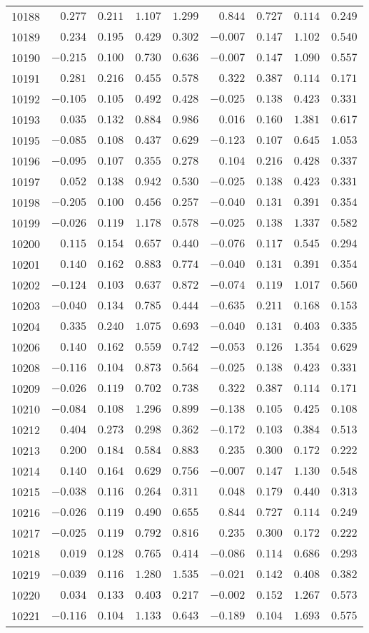 {\begin{longtable}{l|rrrr|rrrr}
10188&$ 0.277$&$0.211$&$1.107$&$1.299$&$ 0.844$&$0.727$&$0.114$&$0.249$\tabularnewline
10189&$ 0.234$&$0.195$&$0.429$&$0.302$&$-0.007$&$0.147$&$1.102$&$0.540$\tabularnewline
10190&$-0.215$&$0.100$&$0.730$&$0.636$&$-0.007$&$0.147$&$1.090$&$0.557$\tabularnewline
10191&$ 0.281$&$0.216$&$0.455$&$0.578$&$ 0.322$&$0.387$&$0.114$&$0.171$\tabularnewline
10192&$-0.105$&$0.105$&$0.492$&$0.428$&$-0.025$&$0.138$&$0.423$&$0.331$\tabularnewline
10193&$ 0.035$&$0.132$&$0.884$&$0.986$&$ 0.016$&$0.160$&$1.381$&$0.617$\tabularnewline
10195&$-0.085$&$0.108$&$0.437$&$0.629$&$-0.123$&$0.107$&$0.645$&$1.053$\tabularnewline
10196&$-0.095$&$0.107$&$0.355$&$0.278$&$ 0.104$&$0.216$&$0.428$&$0.337$\tabularnewline
10197&$ 0.052$&$0.138$&$0.942$&$0.530$&$-0.025$&$0.138$&$0.423$&$0.331$\tabularnewline
10198&$-0.205$&$0.100$&$0.456$&$0.257$&$-0.040$&$0.131$&$0.391$&$0.354$\tabularnewline
10199&$-0.026$&$0.119$&$1.178$&$0.578$&$-0.025$&$0.138$&$1.337$&$0.582$\tabularnewline
10200&$ 0.115$&$0.154$&$0.657$&$0.440$&$-0.076$&$0.117$&$0.545$&$0.294$\tabularnewline
10201&$ 0.140$&$0.162$&$0.883$&$0.774$&$-0.040$&$0.131$&$0.391$&$0.354$\tabularnewline
10202&$-0.124$&$0.103$&$0.637$&$0.872$&$-0.074$&$0.119$&$1.017$&$0.560$\tabularnewline
10203&$-0.040$&$0.134$&$0.785$&$0.444$&$-0.635$&$0.211$&$0.168$&$0.153$\tabularnewline
10204&$ 0.335$&$0.240$&$1.075$&$0.693$&$-0.040$&$0.131$&$0.403$&$0.335$\tabularnewline
10206&$ 0.140$&$0.162$&$0.559$&$0.742$&$-0.053$&$0.126$&$1.354$&$0.629$\tabularnewline
10208&$-0.116$&$0.104$&$0.873$&$0.564$&$-0.025$&$0.138$&$0.423$&$0.331$\tabularnewline
10209&$-0.026$&$0.119$&$0.702$&$0.738$&$ 0.322$&$0.387$&$0.114$&$0.171$\tabularnewline
10210&$-0.084$&$0.108$&$1.296$&$0.899$&$-0.138$&$0.105$&$0.425$&$0.108$\tabularnewline
10212&$ 0.404$&$0.273$&$0.298$&$0.362$&$-0.172$&$0.103$&$0.384$&$0.513$\tabularnewline
10213&$ 0.200$&$0.184$&$0.584$&$0.883$&$ 0.235$&$0.300$&$0.172$&$0.222$\tabularnewline
10214&$ 0.140$&$0.164$&$0.629$&$0.756$&$-0.007$&$0.147$&$1.130$&$0.548$\tabularnewline
10215&$-0.038$&$0.116$&$0.264$&$0.311$&$ 0.048$&$0.179$&$0.440$&$0.313$\tabularnewline
10216&$-0.026$&$0.119$&$0.490$&$0.655$&$ 0.844$&$0.727$&$0.114$&$0.249$\tabularnewline
10217&$-0.025$&$0.119$&$0.792$&$0.816$&$ 0.235$&$0.300$&$0.172$&$0.222$\tabularnewline
10218&$ 0.019$&$0.128$&$0.765$&$0.414$&$-0.086$&$0.114$&$0.686$&$0.293$\tabularnewline
10219&$-0.039$&$0.116$&$1.280$&$1.535$&$-0.021$&$0.142$&$0.408$&$0.382$\tabularnewline
10220&$ 0.034$&$0.133$&$0.403$&$0.217$&$-0.002$&$0.152$&$1.267$&$0.573$\tabularnewline
10221&$-0.116$&$0.104$&$1.133$&$0.643$&$-0.189$&$0.104$&$1.693$&$0.575$\tabularnewline

\end{longtable}}
